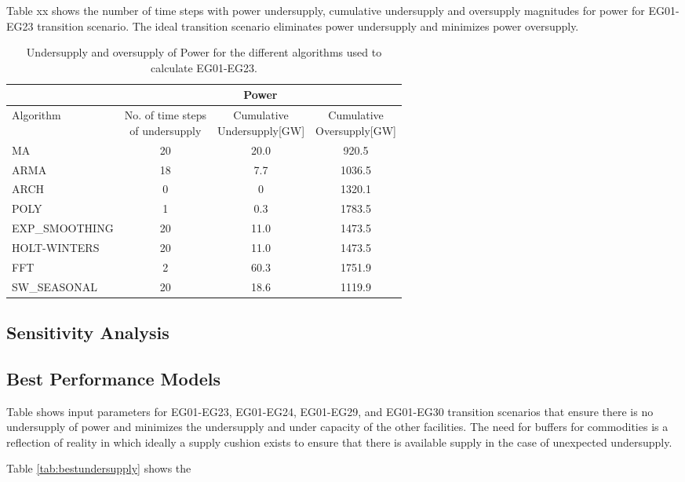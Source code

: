 Table xx shows the number of time steps with power undersupply, 
cumulative undersupply and oversupply magnitudes for power for 
EG01-EG23 transition scenario. 
The ideal transition scenario eliminates power undersupply and 
minimizes power oversupply. 

\begin{table*}[!h]
	\centering
	\caption {Undersupply and oversupply of Power for the different algorithms used to calculate EG01-EG23.}
	\label{tab:23-power}
	\begin{tabular}{|l|c|c|c|}
		\hline
		& \multicolumn{3}{c|}{Power} \\ \hline
		Algorithm & \shortstack{No. of time steps\\of undersupply}  & 
		\shortstack{Cumulative\\Undersupply[GW]}  & \shortstack{Cumulative\\Oversupply[GW]} \\ \hline
		MA        & 20 	& 20.0  &  920.5   \\ \hline
		ARMA      & 18 	&  7.7  &  1036.5  \\ \hline
		ARCH      &  0 	&   0  	&  1320.1  \\ \hline
		POLY      &  1 	&  0.3 	&  1783.5  \\ \hline
		EXP\_SMOOTHING 	& 20 	& 11.0 & 1473.5 \\ \hline
		HOLT-WINTERS  	& 20 	& 11.0 & 1473.5 \\ \hline
		FFT       & 2 	& 60.3 	& 1751.9 	\\ \hline
		SW\_SEASONAL    & 20 	& 18.6 	& 1119.9 	\\ \hline
	\end{tabular}
\end{table*}

\subsection{Sensitivity Analysis}

\subsection{Best Performance Models}
Table %
shows \deploy input parameters for
EG01-EG23, EG01-EG24, EG01-EG29, and EG01-EG30 transition scenarios
that ensure there is no undersupply of power and minimizes 
the undersupply and under capacity of the other facilities. 
The need for buffers for commodities is a reflection of reality
in which ideally a supply cushion exists to ensure that there 
is available supply in the case of unexpected undersupply. 

Table \ref{tab:bestundersupply} shows the


